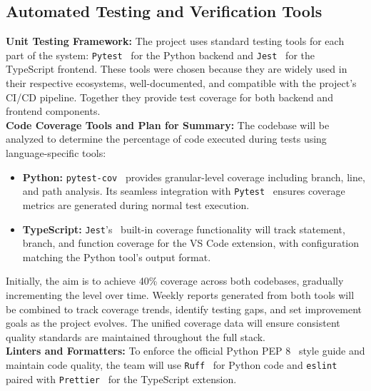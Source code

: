 \documentclass[12pt, titlepage]{article}
\begin{document}
\subsection{Automated Testing and Verification Tools}

\textbf{Unit Testing Framework:} The project uses standard testing tools for each part of the system: \texttt{Pytest}~\cite{pytest} for the Python backend and \texttt{Jest}~\cite{jest} for the TypeScript frontend. These tools were chosen because they are widely used in their respective ecosystems, well-documented, and compatible with the project's CI/CD pipeline. Together they provide test coverage for both backend and frontend components.\\

\noindent\textbf{Code Coverage Tools and Plan for Summary:} The codebase will be analyzed to determine the percentage of code executed during tests using language-specific tools:

\begin{itemize}
    \item \textbf{Python:} \texttt{pytest-cov}~\cite{pytest-cov} provides granular-level coverage including branch, line, and path analysis. Its seamless integration with \texttt{Pytest}~\cite{pytest} ensures coverage metrics are generated during normal test execution.
    
    \item \textbf{TypeScript:} \texttt{Jest}'s~\cite{jest} built-in coverage functionality will track statement, branch, and function coverage for the VS Code extension, with configuration matching the Python tool's output format.
\end{itemize}

\noindent Initially, the aim is to achieve 40\% coverage across both codebases, gradually incrementing the level over time. Weekly reports generated from both tools will be combined to track coverage trends, identify testing gaps, and set improvement goals as the project evolves. The unified coverage data will ensure consistent quality standards are maintained throughout the full stack.\\

\noindent\textbf{Linters and Formatters:} To enforce the official
Python PEP 8~\cite{pep8} style guide and maintain code quality, the team will use
\texttt{Ruff}~\cite{ruff} for Python code and
\texttt{eslint}~\cite{eslint} paired with
\texttt{Prettier}~\cite{prettier} for the TypeScript extension.\\
\end{document}
